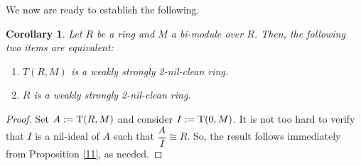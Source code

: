 \documentclass[12pt]{amsart}
\newtheorem{corollary}[theorem]{Corollary}
\theoremstyle{definition}
\begin{document}
We now are ready to establish the following.

\begin{corollary}\label{2.17}
Let $R$ be a ring and $M$ a bi-module over $R$. Then, the following two items are equivalent:
\begin{enumerate}
\item
$T(R, M)$ is a weakly strongly 2-nil-clean ring.
\item
$R$ is a weakly strongly 2-nil-clean ring.
\end{enumerate}
\end{corollary}

\begin{proof}
Set $A:={\rm T}(R, M)$ and consider $I:={\rm T}(0, M)$. It is not too hard to verify that $I$ is a nil-ideal of $A$ such that $\dfrac{A}{I} \cong R$. So, the result follows immediately from Proposition \ref{11}, as needed.
\end{proof}
\end{document}
